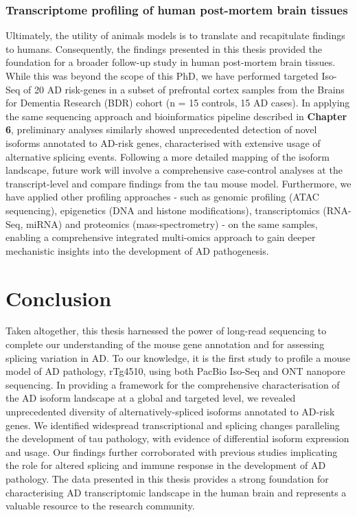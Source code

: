 \subsubsection{Transcriptome profiling of human post-mortem brain tissues}  
Ultimately, the utility of animals models is to translate and recapitulate findings to humans. Consequently, the findings presented in this thesis provided the foundation for a broader follow-up study in human post-mortem brain tissues. While this was beyond the scope of this PhD, we have performed targeted Iso-Seq of 20 AD risk-genes in a subset of prefrontal cortex samples from the Brains for Dementia Research (BDR) cohort (n = 15 controls, 15 AD cases). In applying the same sequencing approach and bioinformatics pipeline described in \textbf{Chapter 6}, preliminary analyses similarly showed unprecedented detection of novel isoforms annotated to AD-risk genes, characterised with extensive usage of alternative splicing events. Following a more detailed mapping of the isoform landscape, future work will involve a comprehensive case-control analyses at the transcript-level and compare findings from the tau mouse model. Furthermore, we have applied other profiling approaches - such as genomic profiling (ATAC sequencing), epigenetics (DNA and histone modifications), transcriptomics (RNA-Seq, miRNA) and proteomics (mass-spectrometry) - on the same samples, enabling a comprehensive integrated multi-omics approach to gain deeper mechanistic insights into the development of AD pathogenesis.     

\section{Conclusion}
Taken altogether, this thesis harnessed the power of long-read sequencing to complete our understanding of the mouse gene annotation and for assessing splicing variation in AD. To our knowledge, it is the first study to profile a mouse model of AD pathology, rTg4510, using both PacBio Iso-Seq and ONT nanopore sequencing. In providing a framework for the comprehensive characterisation of the AD isoform landscape at a global and targeted level, we revealed unprecedented diversity of alternatively-spliced isoforms annotated to AD-risk genes. We identified widespread transcriptional and splicing changes paralleling the development of tau pathology, with evidence of differential isoform expression and usage. Our findings further corroborated with previous studies implicating the role for altered splicing and immune response in the development of AD pathology. The data presented in this thesis provides a strong foundation for characterising AD transcriptomic landscape in the human brain and represents a valuable resource to the research community.     